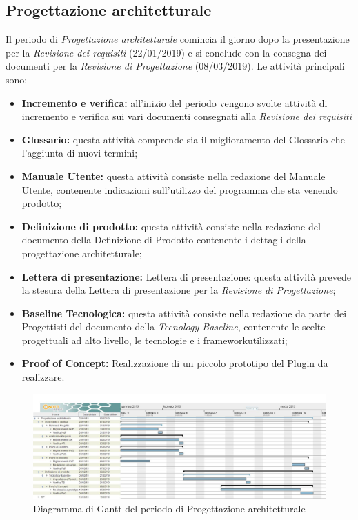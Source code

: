 \newpage
\subsection{Progettazione architetturale}
Il periodo di \textit{Progettazione architetturale} comincia il giorno dopo la presentazione per la \textit{Revisione dei requisiti} (22/01/2019) e si conclude con la consegna dei documenti per la \textit{Revisione di Progettazione} (08/03/2019). Le attività principali sono:
\begin{itemize}
	\item\textbf{Incremento e verifica:} all'inizio del periodo vengono svolte attività di incremento e verifica sui vari documenti consegnati alla \textit{Revisione dei requisiti}
	\item\textbf{Glossario:} questa attività comprende sia il miglioramento del Glossario che l’aggiunta di nuovi termini;
	\item\textbf{Manuale Utente:}  questa attività consiste nella redazione del Manuale Utente, contenente indicazioni sull’utilizzo del programma che sta venendo prodotto;
	\item\textbf{Definizione di prodotto:} questa attività consiste nella redazione del documento della Definizione di Prodotto contenente i dettagli della progettazione architetturale;
	\item\textbf{Lettera di presentazione:} Lettera di presentazione: questa attività prevede la stesura della Lettera di presentazione per la \textit{Revisione di Progettazione};
	\item\textbf{Baseline Tecnologica:} questa attività consiste nella redazione da parte dei Progettisti del documento della \textit{Tecnology Baseline}\pedice, contenente le scelte progettuali ad alto livello, le tecnologie e i framework\pedice utilizzati;
	\item \textbf{Proof of Concept:} Realizzazione di un piccolo prototipo del Plugin da realizzare.
\end{itemize}

\begin{figure}[h!]
	\centering
	\includegraphics[width=\textwidth]{Gantt_seconda_fase.jpg}
	\caption{Diagramma di Gantt del periodo di Progettazione architetturale}
\end{figure}

